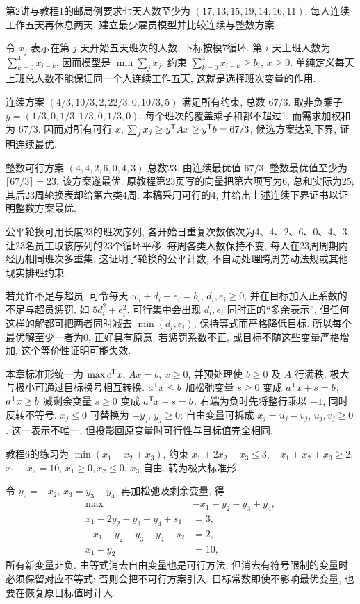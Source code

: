 \begin{example}
第2讲与教程1的邮局例要求七天人数至少为 $(17,13,15,19,14,16,11)$, 每人连续工作五天再休息两天. 建立最少雇员模型并比较连续与整数方案.
\end{example}
\begin{solution}
令 $x_j$ 表示在第 $j$ 天开始五天班次的人数, 下标按模7循环. 第 $i$ 天上班人数为 $\sum_{k=0}^4x_{i-k}$, 因而模型是 $\min\sum_jx_j$, 约束 $\sum_{k=0}^4x_{i-k}\ge b_i$, $x\ge0$. 单纯定义每天上班总人数不能保证同一个人连续工作五天, 这就是选择班次变量的作用.

连续方案 $(4/3,10/3,2,22/3,0,10/3,5)$ 满足所有约束, 总数 $67/3$. 取非负乘子 $y=(1/3,0,1/3,1/3,0,1/3,0)$. 每个班次的覆盖乘子和都不超过1, 而需求加权和为 $67/3$. 因而对所有可行 $x$, $\sum_jx_j\ge y^{\mathsf T} Ax\ge y^{\mathsf T} b=67/3$, 候选方案达到下界, 证明连续最优.

整数可行方案 $(4,4,2,6,0,4,3)$ 总数23. 由连续最优值 $67/3$, 整数最优值至少为 $\lceil67/3\rceil=23$, 该方案遂最优. 原教程第23页写的向量把第六项写为6, 总和实际为25; 其后23周轮换表却给第六类4周. 本稿采用可行的4, 并给出上述连续下界证书以证明整数方案最优.

公平轮换可用长度23的班次序列, 各开始日重复次数依次为4、4、2、6、0、4、3. 让23名员工取该序列的23个循环平移, 每周各类人数保持不变, 每人在23周周期内经历相同班次多重集. 这证明了轮换的公平计数, 不自动处理跨周劳动法规或其他现实排班约束.
\end{solution}

若允许不足与超员, 可令每天 $w_i+d_i-e_i=b_i$, $d_i,e_i\ge0$, 并在目标加入正系数的不足与超员惩罚, 如 $5d_i^2+e_i^2$. 可行集中会出现 $d_i,e_i$ 同时正的“多余表示”, 但任何这样的解都可把两者同时减去 $\min(d_i,e_i)$, 保持等式而严格降低目标. 所以每个最优解至少一者为0, 正好具有原意. 若惩罚系数不正, 或目标不随这些变量严格增加, 这个等价性证明可能失效.

本章标准形统一为 $\max c^{\mathsf T} x$, $Ax=b$, $x\ge0$, 并预处理使 $b\ge0$ 及 $A$ 行满秩. 极大与极小可通过目标换号相互转换. $a^{\mathsf T} x\le b$ 加松弛变量 $s\ge0$ 变成 $a^{\mathsf T} x+s=b$; $a^{\mathsf T} x\ge b$ 减剩余变量 $s\ge0$ 变成 $a^{\mathsf T} x-s=b$. 右端为负时先将整行乘以 $-1$, 同时反转不等号. $x_j\le0$ 可替换为 $-y_j$, $y_j\ge0$; 自由变量可拆成 $x_j=u_j-v_j$, $u_j,v_j\ge0$. 这一表示不唯一, 但投影回原变量时可行性与目标值完全相同.

\begin{example}
教程6的练习为 $\min(x_1-x_2+x_3)$, 约束 $x_1+2x_2-x_3\le3$, $-x_1+x_2+x_3\ge2$, $x_1-x_2=10$, $x_1\ge0,x_2\le0$, $x_3$ 自由. 转为极大标准形.
\end{example}
\begin{solution}
令 $y_2=-x_2$, $x_3=y_3-y_4$, 再加松弛及剩余变量, 得
\begin{align*}
\max\quad&-x_1-y_2-y_3+y_4,\\
 x_1-2y_2-y_3+y_4+s_1&=3,\\
 -x_1-y_2+y_3-y_4-s_2&=2,\\
 x_1+y_2&=10,
\end{align*}
所有新变量非负. 由等式消去自由变量也是可行方法, 但消去有符号限制的变量时必须保留对应不等式; 否则会把不可行方案引入. 目标常数即使不影响最优变量, 也要在恢复原目标值时计入.
\end{solution}

